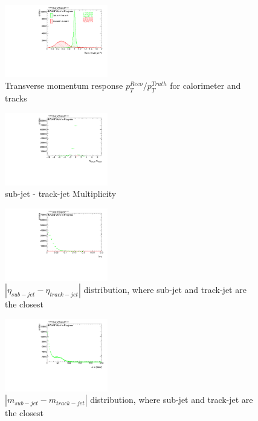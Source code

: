 \begin{figure}
 
\includegraphics[width=0.4\textwidth]{appendixB/mTAS_W_calibmCal_20:07:01-03-11-2016/1cfrt_h_JetRatio_pt.pdf}
\caption{Transverse momentum response $p_{T}^{Reco} / p_{T}^{Truth}$ for calorimeter and tracks}
 
\end{figure}
 
\begin{figure}
 
\includegraphics[width=0.4\textwidth]{appendixB/mTAS_W_calibmCal_20:07:01-03-11-2016/1cfrt_h_NfminusNi.pdf}
\caption{sub-jet - track-jet Multiplicity}
 
\end{figure}

\clearpage

\begin{figure}
 
\includegraphics[width=0.4\textwidth]{appendixB/mTAS_W_calibmCal_20:07:01-03-11-2016/1cfrt_h_SubJet_Delta_eta.pdf}
\caption{$| \eta_{sub-jet} - \eta_{track-jet} | $ distribution, where sub-jet and track-jet are the closest}
 
\end{figure}
 
\begin{figure}
 
\includegraphics[width=0.4\textwidth]{appendixB/mTAS_W_calibmCal_20:07:01-03-11-2016/1cfrt_h_SubJet_Delta_m.pdf}
\caption{$| m_{sub-jet} - m_{track-jet} |$ distribution, where sub-jet and track-jet are the closest}
 
\end{figure}
 
